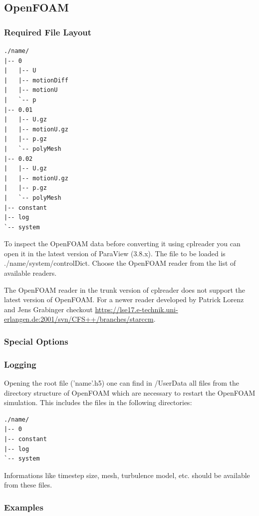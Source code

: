 \documentclass[a4paper,10pt]{article}
\begin{document}
\newpage
\subsection{OpenFOAM}
\label{sec:openfoam}

\subsubsection{Required File Layout}
\begin{verbatim}
./name/
|-- 0
|   |-- U
|   |-- motionDiff
|   |-- motionU
|   `-- p
|-- 0.01
|   |-- U.gz
|   |-- motionU.gz
|   |-- p.gz
|   `-- polyMesh
|-- 0.02
|   |-- U.gz
|   |-- motionU.gz
|   |-- p.gz
|   `-- polyMesh
|-- constant
|-- log
`-- system
\end{verbatim}

To inspect the OpenFOAM data before converting it using cplreader you can open
it  in the  latest  version of  ParaView (3.8.x).  The  file to  be loaded  is
./name/system/controlDict.  Choose  the  OpenFOAM  reader  from  the  list  of
available readers.

The OpenFOAM  reader in the  trunk version of  cplreader does not  support the
latest version of OpenFOAM. For a newer reader developed by Patrick Lorenz and
Jens                             Grabinger                            checkout
\url{https://lse17.e-technik.uni-erlangen.de:2001/svn/CFS++/branches/starccm}.

\subsubsection{Special Options}

\subsubsection{Logging} 

Opening the  root \hdf file  ('name'.h5) one can  find in /UserData  all files
from the  directory structure of OpenFOAM  which are necessary  to restart the
OpenFOAM simulation. This includes the files in the following directories:

\begin{verbatim}
./name/
|-- 0
|-- constant
|-- log
`-- system
\end{verbatim}

Informations  like  timestep size,  mesh,  turbulence  model,  etc. should  be
available from these files.

\subsubsection{Examples}
\end{document}
